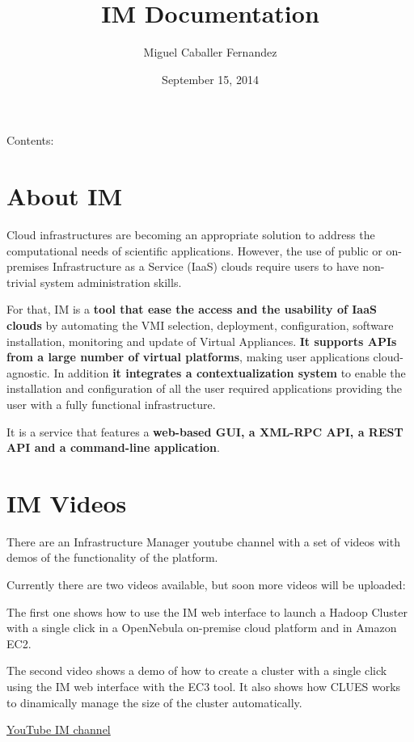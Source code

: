 \documentclass[letterpaper,10pt,english]{sphinxmanual}
\title{IM Documentation}
\date{September 15, 2014}
\author{Miguel Caballer Fernandez}
\begin{document}
\maketitle
\tableofcontents
{}\label{index::doc}


Contents:


\chapter{About IM}
\label{intro::doc}\label{intro:welcome-to-im-s-documentation}\label{intro:about-im}
Cloud infrastructures are becoming an appropriate solution to address the
computational needs of scientific applications. However, the use of public or
on-premises Infrastructure as a Service (IaaS) clouds require users to have
non-trivial system administration skills.

For that, IM is a \textbf{tool that ease the access and the usability of IaaS
clouds} by automating the VMI selection, deployment, configuration, software
installation, monitoring and update of Virtual Appliances. \textbf{It supports APIs
from a large number of virtual platforms}, making user applications
cloud-agnostic. In addition \textbf{it integrates a contextualization system} to
enable the installation and configuration of all the user required applications
providing the user with a fully functional infrastructure.

It is a service that features a \textbf{web-based GUI, a XML-RPC API, a REST API and
a command-line application}.


\chapter{IM Videos}
\label{videos::doc}\label{videos:im-videos}
There are an Infrastructure Manager youtube channel with a set of videos with demos
of the functionality of the platform.

Currently there are two videos available, but soon more videos will be uploaded:

The first one shows how to use the IM web interface to launch a Hadoop Cluster with a
single click in a OpenNebula on-premise cloud platform and in Amazon EC2.

The second video shows a demo of how to create a cluster with a single click using the
IM web interface with the EC3 tool. It also shows how CLUES works to dinamically manage
the size of the cluster automatically.

\href{https://www.youtube.com/channel/UCF16QmMHlRNtsC-0Cb2d8fg}{YouTube IM channel}
\end{document}

